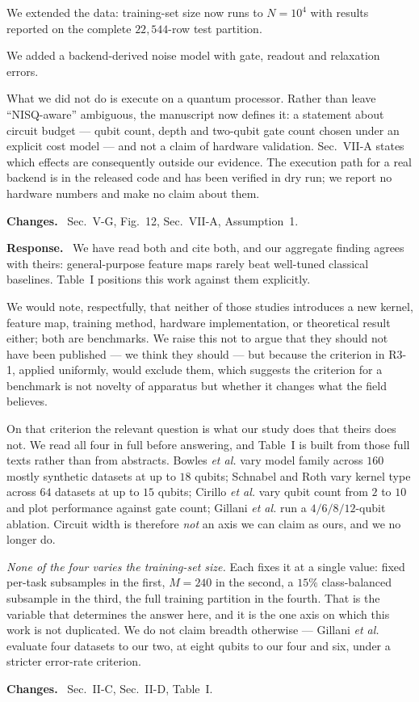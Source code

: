 \documentclass[11pt,a4paper]{article}
\newcommand{\itemhead}[2]{%
  \par\addvspace{15pt}%
  \noindent{\bfseries\color{tagink}#1}\hspace{0.7em}{\bfseries #2}%
  \par\addvspace{3.5pt}%
  \noindent{\color{rulegray}\rule{\linewidth}{0.5pt}}%
  \par\addvspace{5pt}%
  \nobreak}
\newcommand{\resp}{\par\addvspace{2pt}\noindent\textbf{Response.}\ }
\newcommand{\changed}{\par\addvspace{5pt}\noindent
  {\bfseries\color{tagink}Changes.}\ }
\begin{document}
We extended the data: training-set size now runs to $N=10^{4}$ with results
reported on the complete $22{,}544$-row test partition.

We added a backend-derived noise model with gate, readout and relaxation errors.

What we did not do is execute on a quantum processor. Rather than leave
``NISQ-aware'' ambiguous, the manuscript now defines it: a statement about
circuit budget --- qubit count, depth and two-qubit gate count chosen under an
explicit cost model --- and not a claim of hardware validation. Sec.~VII-A states
which effects are consequently outside our evidence. The execution path for a
real backend is in the released code and has been verified in dry run; we report
no hardware numbers and make no claim about them.
\changed
Sec.~V-G, Fig.~12, Sec.~VII-A, Assumption~1.

\itemhead{R3-5}{Results are already established in prior benchmarking studies
(arXiv:2403.07059, arXiv:2409.04406)}
\resp
We have read both and cite both, and our aggregate finding agrees with theirs:
general-purpose feature maps rarely beat well-tuned classical baselines. Table~I
positions this work against them explicitly.

We would note, respectfully, that neither of those studies introduces a new
kernel, feature map, training method, hardware implementation, or theoretical
result either; both are benchmarks. We raise this not to argue that they should
not have been published --- we think they should --- but because the criterion in
R3-1, applied uniformly, would exclude them, which suggests the criterion for a
benchmark is not novelty of apparatus but whether it changes what the field
believes.

On that criterion the relevant question is what our study does that theirs does
not. We read all four in full before answering, and Table~I is built from those
full texts rather than from abstracts. Bowles \emph{et al.} vary model family
across $160$ mostly synthetic datasets at up to $18$ qubits; Schnabel and Roth
vary kernel type across $64$ datasets at up to $15$ qubits; Cirillo \emph{et al.}
vary qubit count from $2$ to $10$ and plot performance against gate count;
Gillani \emph{et al.} run a $4/6/8/12$-qubit ablation. Circuit width is
therefore \emph{not} an axis we can claim as ours, and we no longer do.

\emph{None of the four varies the training-set size.} Each fixes it at a single
value: fixed per-task subsamples in the first, $M=240$ in the second, a $15\%$
class-balanced subsample in the third, the full training partition in the
fourth. That is the variable that determines the answer here, and it is the one
axis on which this work is not duplicated. We do not claim breadth otherwise ---
Gillani \emph{et al.} evaluate four datasets to our two, at eight qubits to our
four and six, under a stricter error-rate criterion.
\changed
Sec.~II-C, Sec.~II-D, Table~I.
\end{document}
